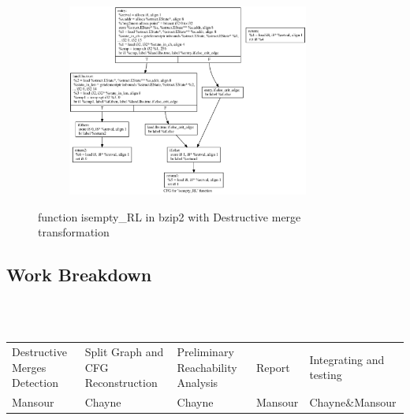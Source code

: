\documentclass{article}
\begin{document}
\begin{figure}[H]
\begin{subfigure}{1\textwidth}
  \centering
\includegraphics[width=300px]{bzip2-example-dm} 
\end{subfigure}%
\caption{function isempty\_RL in bzip2 with Destructive merge transformation}
\label{fig:test}
\end{figure}


\subsection{Work Breakdown}
~\\~
\begin{adjustbox}{center}
\renewcommand{\arraystretch}{2}
\begin{tabular}{| C{3cm} | C{3cm} | C{3cm} | C{3cm} | C{3cm} |}
\hline
Destructive Merges Detection & Split Graph and CFG Reconstruction & Preliminary Reachability Analysis & Report & Integrating and testing \\  
Mansour & Chayne & Chayne & Mansour &  Chayne\&Mansour \\ 

\end{tabular}
\end{adjustbox}
\end{document}
